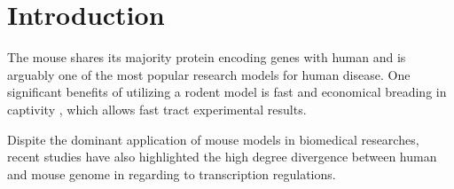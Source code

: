 \section{Introduction}

The mouse shares its majority protein encoding genes with human and is arguably one of the most popular research models for human disease. One significant benefits of utilizing a rodent model is fast and economical breading in captivity \cite{Rosenthal_2007}, which allows fast tract experimental results. \cite{Vandamme_2014} 

Dispite the dominant application of mouse models in biomedical researches, recent studies have also highlighted the high degree divergence between human and mouse genome in regarding to transcription regulations. \cite{25409824} 